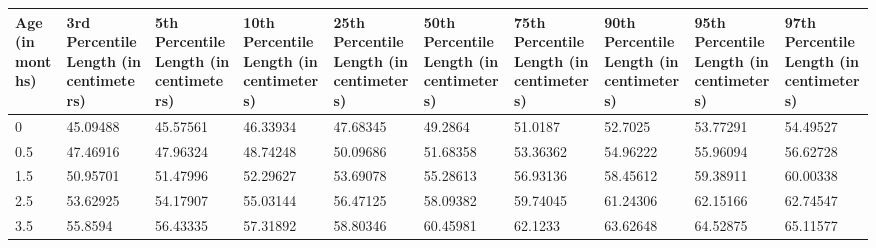 \documentclass[10pt,twocolumn,letterpaper]{article}
\begin{document}
\begin{table}
    \begin{tabular}{llllllllll}
    Age (in months) & 3rd Percentile Length (in centimeters) & 5th Percentile Length (in centimeters) & 10th Percentile Length (in centimeters) & 25th Percentile Length (in centimeters) & 50th Percentile Length (in centimeters) & 75th Percentile Length (in centimeters) & 90th Percentile Length (in centimeters) & 95th Percentile Length (in centimeters) & 97th Percentile Length (in centimeters) \\
		\hline
    0               & 45.09488                               & 45.57561                               & 46.33934                                & 47.68345                                & 49.2864                                 & 51.0187                                 & 52.7025                                 & 53.77291                                & 54.49527                                \\
    0.5             & 47.46916                               & 47.96324                               & 48.74248                                & 50.09686                                & 51.68358                                & 53.36362                                & 54.96222                                & 55.96094                                & 56.62728                                \\
    1.5             & 50.95701                               & 51.47996                               & 52.29627                                & 53.69078                                & 55.28613                                & 56.93136                                & 58.45612                                & 59.38911                                & 60.00338                                \\
    2.5             & 53.62925                               & 54.17907                               & 55.03144                                & 56.47125                                & 58.09382                                & 59.74045                                & 61.24306                                & 62.15166                                & 62.74547                                \\
    3.5             & 55.8594                                & 56.43335                               & 57.31892                                & 58.80346                                & 60.45981                                & 62.1233                                 & 63.62648                                & 64.52875                                & 65.11577                                \\

\end{tabular}
\end{table}
\end{document}
